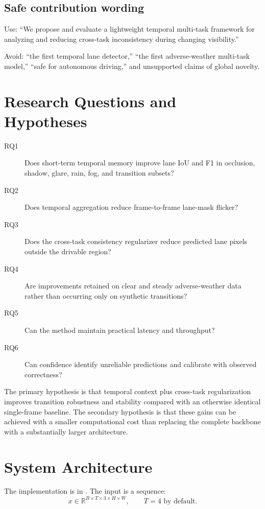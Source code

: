 \documentclass[11pt,a4paper]{article}
\begin{document}
\subsection{Safe contribution wording}
Use: ``We propose and evaluate a lightweight temporal multi-task framework for analyzing and reducing cross-task inconsistency during changing visibility.''

Avoid: ``the first temporal lane detector,'' ``the first adverse-weather multi-task model,'' ``safe for autonomous driving,'' and unsupported claims of global novelty.

\section{Research Questions and Hypotheses}

\begin{description}
\item[RQ1] Does short-term temporal memory improve lane IoU and F1 in occlusion, shadow, glare, rain, fog, and transition subsets?
\item[RQ2] Does temporal aggregation reduce frame-to-frame lane-mask flicker?
\item[RQ3] Does the cross-task consistency regularizer reduce predicted lane pixels outside the drivable region?
\item[RQ4] Are improvements retained on clear and steady adverse-weather data rather than occurring only on synthetic transitions?
\item[RQ5] Can the method maintain practical latency and throughput?
\item[RQ6] Can confidence identify unreliable predictions and calibrate with observed correctness?
\end{description}

The primary hypothesis is that temporal context plus cross-task regularization improves transition robustness and stability compared with an otherwise identical single-frame baseline. The secondary hypothesis is that these gains can be achieved with a smaller computational cost than replacing the complete backbone with a substantially larger architecture.

\section{System Architecture}

The implementation is in . The input is a sequence:
\[
x \in \mathbb{R}^{B \times T \times 3 \times H \times W}, \qquad T=4 \text{ by default}.
\]
\end{document}
